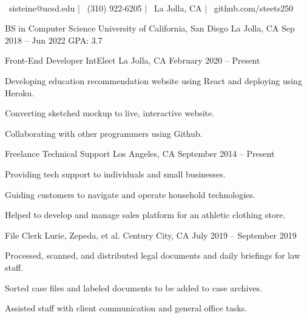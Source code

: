 \documentclass[]{awesome-cv}
\begin{document}
    
\begin{center}
	  \\
	\vspace{2mm}
	{\faEnvelope\ sisteine@ucsd.edu} | {\faMobile\ (310) 922-6205} | {\faMapMarker\ La Jolla, CA} | {\faLink\ github.com/steets250}
\end{center}
\begin{cventries}
	\cventry
	{BS in Computer Science}
	{University of California, San Diego}
	{La Jolla, CA}
	{Sep 2018 – Jun 2022}
	{GPA: 3.7}
\end{cventries}

\vspace{-2mm}
\begin{cventries}
	\cventry
	{Front-End Developer}
	{IntElect}
	{La Jolla, CA}
	{February 2020 – Present}
	{\begin{cvitems}
		\item {Developing education recommendation website using React and deploying using Heroku.}
		\item {Converting sketched mockup to live, interactive website.}
		\item {Collaborating with other programmers using Github.}
		\end{cvitems}}
	\cventry
	{Freelance}
	{Technical Support}
	{Los Angeles, CA}
	{September 2014 – Present}
	{\begin{cvitems}
		\item {Providing tech support to individuals and small businesses.}
		\item {Guiding customers to navigate and operate household technologies.}
		\item {Helped to develop and manage sales platform for an athletic clothing store.}
		\end{cvitems}}
	\cventry
	{File Clerk}
	{Lurie, Zepeda, et al.}
	{Century City, CA}
	{July 2019 – September 2019}
	{\begin{cvitems}
		\item {Processed, scanned, and distributed legal documents and daily briefings for law staff.}
		\item {Sorted case files and labeled documents to be added to case archives.}
		\item {Assisted staff with client communication and general office tasks.}
		\end{cvitems}}
	\vspace{-5mm}
\end{cventries}
\end{document}
